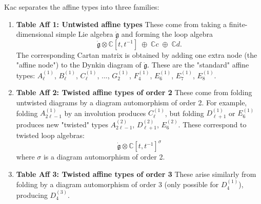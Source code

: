 \documentclass[12pt]{article}
\begin{document}
\begin{remark}
    Kac separates the affine types into three families:
\begin{enumerate}
    \item \textbf{Table Aff 1: Untwisted affine types}
These come from taking a finite-dimensional simple Lie algebra $\dot{\mathfrak{g}}$ and forming the loop algebra
$$\dot{\mathfrak{g}}\otimes \mathbb{C}[t,t^{-1}] \;\oplus\; \mathbb{C}c \;\oplus\; \mathbb{C}d.$$
The corresponding Cartan matrix is obtained by adding one extra node (the "affine node") to the Dynkin diagram of $\dot{\mathfrak{g}}$.
These are the "standard" affine types: $A_\ell^{(1)}$, $B_\ell^{(1)}$, $C_\ell^{(1)}$, ..., $G_2^{(1)}$, $F_4^{(1)}$, $E_6^{(1)}$, $E_7^{(1)}$, $E_8^{(1)}$.

    \item \textbf{Table Aff 2: Twisted affine types of order 2}
These come from folding untwisted diagrams by a diagram automorphism of order 2.
For example, folding $A_{2\ell-1}^{(1)}$ by an involution produces $C_\ell^{(1)}$, but folding $D_{\ell+1}^{(1)}$ or $E_6^{(1)}$ produces new "twisted" types $A_{2\ell-1}^{(2)}$, $D_{\ell+1}^{(2)}$, $E_6^{(2)}$.
These correspond to twisted loop algebras:
$$\dot{\mathfrak{g}}\otimes \mathbb{C}[t,t^{-1}]^\sigma$$
where $\sigma$ is a diagram automorphism of order 2.

    \item \textbf{Table Aff 3: Twisted affine types of order 3}
These arise similarly from folding by a diagram automorphism of order 3 (only possible for $D_4^{(1)}$), producing $D_4^{(3)}$.
\end{enumerate}
\end{remark}
\end{document}
